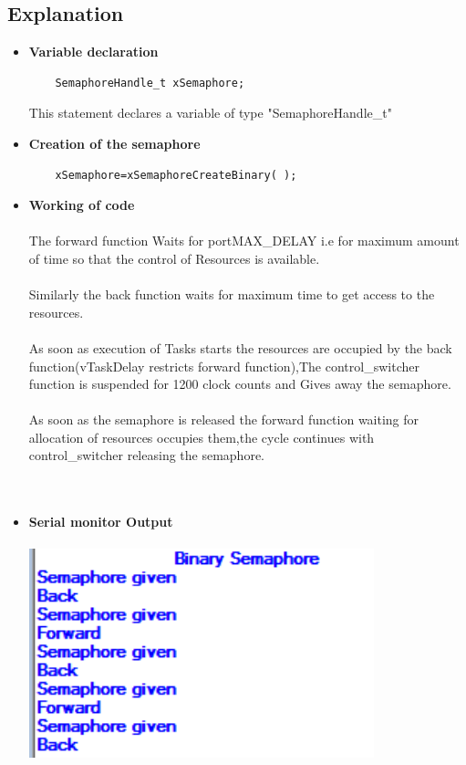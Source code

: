 \documentclass[11pt,a4paper]{article}
\begin{document}
\subsection{Explanation}
	\begin{itemize}
	\item \textbf{Variable declaration}	
	
	\begin{lstlisting}
	SemaphoreHandle_t xSemaphore;
	\end{lstlisting}
	
	 This statement declares a variable of type "SemaphoreHandle\_t"
	
	\item \textbf{Creation of the semaphore}
	
	\begin{lstlisting}
	xSemaphore=xSemaphoreCreateBinary( );
	\end{lstlisting}

\item \textbf{Working of code}
	  \\
	  \\
	  The forward function Waits for portMAX\_DELAY i.e for maximum amount of time so that the control of Resources is available.
	  \\
	  \\
	  Similarly the back function waits for maximum time to get access to the resources.
	  \\
	  \\	
	  As soon as execution of Tasks starts the resources are occupied by the back function(vTaskDelay restricts forward function),The control\_switcher function is suspended for 1200 clock counts and Gives away the semaphore.
	  \\
	  \\
	  As soon as the semaphore is released the forward function waiting for allocation of resources occupies them,the cycle continues with control\_switcher releasing the semaphore.  
		\\
		\\
		\\
\item \textbf{Serial monitor Output} 
\\
\\
\includegraphics[width=10cm]{bin}

\end{itemize}
\newpage 
\end{document}
